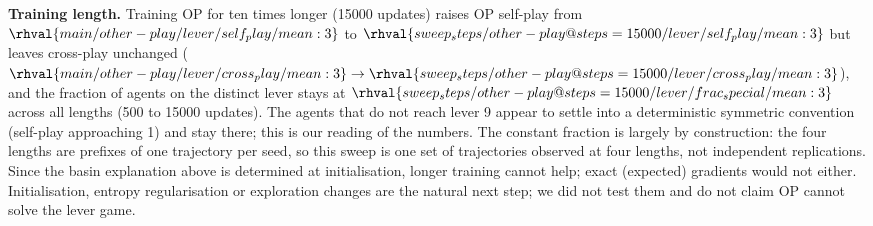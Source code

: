 \begin{table}[t]\centering\caption{OP training length, lever game (5 seeds; 1500 updates is the main configuration).}\label{tab:steps}
\resizebox{\columnwidth}{!}{}\end{table}

\textbf{Training length.} Training OP for ten times longer (15000 updates) raises OP self-play from $\rhval{main/other-play/lever/self_play/mean:3}$ to $\rhval{sweep_steps/other-play@steps=15000/lever/self_play/mean:3}$ but leaves cross-play unchanged ($\rhval{main/other-play/lever/cross_play/mean:3}\to\rhval{sweep_steps/other-play@steps=15000/lever/cross_play/mean:3}$), and the fraction of agents on the distinct lever stays at $\rhval{sweep_steps/other-play@steps=15000/lever/frac_special/mean:3}$ across all lengths (500 to 15000 updates). The agents that do not reach lever 9 appear to settle into a deterministic symmetric convention (self-play approaching 1) and stay there; this is our reading of the numbers. The constant fraction is largely by construction: the four lengths are prefixes of one trajectory per seed, so this sweep is one set of trajectories observed at four lengths, not independent replications. Since the basin explanation above is determined at initialisation, longer training cannot help; exact (expected) gradients would not either. Initialisation, entropy regularisation or exploration changes are the natural next step; we did not test them and do not claim OP cannot solve the lever game.
